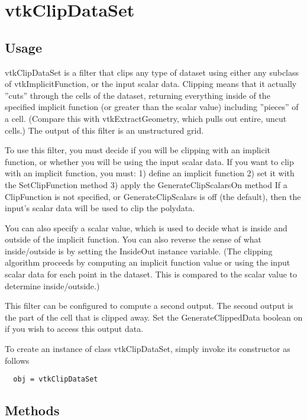 \section{vtkClipDataSet}

\subsection{Usage}

 vtkClipDataSet is a filter that clips any type of dataset using either
 any subclass of vtkImplicitFunction, or the input scalar
 data. Clipping means that it actually ''cuts'' through the cells of
 the dataset, returning everything inside of the specified implicit
 function (or greater than the scalar value) including ''pieces'' of
 a cell. (Compare this with vtkExtractGeometry, which pulls out
 entire, uncut cells.) The output of this filter is an unstructured
 grid.

 To use this filter, you must decide if you will be clipping with an
 implicit function, or whether you will be using the input scalar
 data.  If you want to clip with an implicit function, you must:
 1) define an implicit function
 2) set it with the SetClipFunction method
 3) apply the GenerateClipScalarsOn method
 If a ClipFunction is not specified, or GenerateClipScalars is off
 (the default), then the input's scalar data will be used to clip
 the polydata.

 You can also specify a scalar value, which is used to decide what is
 inside and outside of the implicit function. You can also reverse the
 sense of what inside/outside is by setting the InsideOut instance
 variable. (The clipping algorithm proceeds by computing an implicit
 function value or using the input scalar data for each point in the
 dataset. This is compared to the scalar value to determine
 inside/outside.)

 This filter can be configured to compute a second output. The
 second output is the part of the cell that is clipped away. Set the
 GenerateClippedData boolean on if you wish to access this output data.

To create an instance of class vtkClipDataSet, simply
invoke its constructor as follows
\begin{verbatim}
  obj = vtkClipDataSet
\end{verbatim}
\subsection{Methods}

